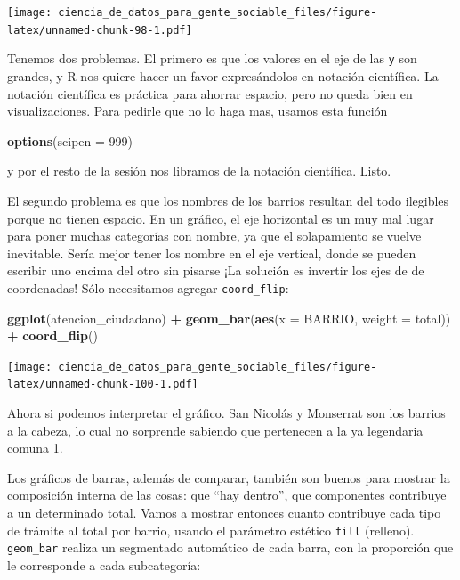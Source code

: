 \documentclass[spanish,]{book}
\newenvironment{Shaded}{\begin{snugshade}}{\end{snugshade}}
\newcommand{\DataTypeTok}[1]{\textcolor[rgb]{0.13,0.29,0.53}{#1}}
\newcommand{\DecValTok}[1]{\textcolor[rgb]{0.00,0.00,0.81}{#1}}
\newcommand{\KeywordTok}[1]{\textcolor[rgb]{0.13,0.29,0.53}{\textbf{#1}}}
\newcommand{\NormalTok}[1]{#1}
\newcommand{\OperatorTok}[1]{\textcolor[rgb]{0.81,0.36,0.00}{\textbf{#1}}}
\newcommand{\StringTok}[1]{\textcolor[rgb]{0.31,0.60,0.02}{#1}}
\begin{document}
\texttt{[image: ciencia\_de\_datos\_para\_gente\_sociable\_files/figure-latex/unnamed-chunk-98-1.pdf]}

Tenemos dos problemas. El primero es que los valores en el eje de las \texttt{y} son grandes, y R nos quiere hacer un favor expresándolos en notación científica. La notación científica es práctica para ahorrar espacio, pero no queda bien en visualizaciones. Para pedirle que no lo haga mas, usamos esta función

\begin{Shaded}
\begin{Highlighting}[]
\KeywordTok{options}\NormalTok{(}\DataTypeTok{scipen =} \DecValTok{999}\NormalTok{)}
\end{Highlighting}
\end{Shaded}

y por el resto de la sesión nos libramos de la notación científica. Listo.

El segundo problema es que los nombres de los barrios resultan del todo ilegibles porque no tienen espacio. En un gráfico, el eje horizontal es un muy mal lugar para poner muchas categorías con nombre, ya que el solapamiento se vuelve inevitable. Sería mejor tener los nombre en el eje vertical, donde se pueden escribir uno encima del otro sin pisarse ¡La solución es invertir los ejes de de coordenadas! Sólo necesitamos agregar \texttt{coord\_flip}:

\begin{Shaded}
\begin{Highlighting}[]
\KeywordTok{ggplot}\NormalTok{(atencion_ciudadano) }\OperatorTok{+}
\StringTok{    }\KeywordTok{geom_bar}\NormalTok{(}\KeywordTok{aes}\NormalTok{(}\DataTypeTok{x =}\NormalTok{ BARRIO, }\DataTypeTok{weight =}\NormalTok{ total)) }\OperatorTok{+}
\StringTok{    }\KeywordTok{coord_flip}\NormalTok{()}
\end{Highlighting}
\end{Shaded}

\texttt{[image: ciencia\_de\_datos\_para\_gente\_sociable\_files/figure-latex/unnamed-chunk-100-1.pdf]}

Ahora si podemos interpretar el gráfico. San Nicolás y Monserrat son los barrios a la cabeza, lo cual no sorprende sabiendo que pertenecen a la ya legendaria comuna 1.

Los gráficos de barras, además de comparar, también son buenos para mostrar la composición interna de las cosas: que ``hay dentro'', que componentes contribuye a un determinado total. Vamos a mostrar entonces cuanto contribuye cada tipo de trámite al total por barrio, usando el parámetro estético \texttt{fill} (relleno). \texttt{geom\_bar} realiza un segmentado automático de cada barra, con la proporción que le corresponde a cada subcategoría:
\end{document}
